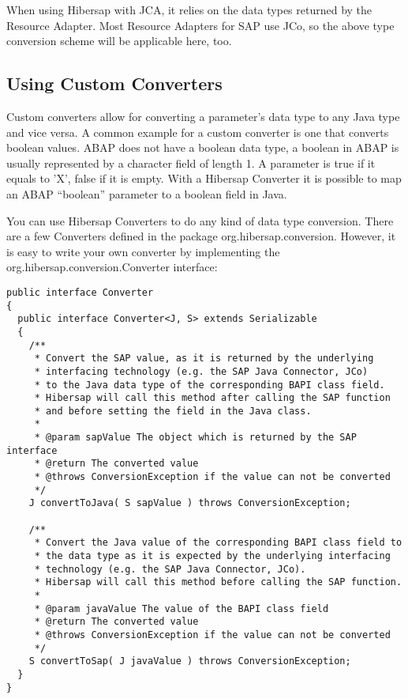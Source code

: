 When using Hibersap with JCA, it relies on the data types returned by the Resource Adapter. Most Resource Adapters for SAP use JCo, so the above type conversion scheme will be applicable here, too. 

\subsection{Using Custom Converters}

Custom converters allow for converting a parameter's data type to any Java type and vice versa. A common example for a custom converter is one that converts boolean values. ABAP does not have a boolean data type, a boolean in ABAP is usually represented by a character field of length 1. A parameter is true if it equals to 'X', false if it is empty. With a Hibersap Converter it is possible to map an ABAP ``boolean'' parameter to a boolean field in Java.

You can use Hibersap Converters to do any kind of data type conversion. There are a few Converters defined in the package org.hibersap.conversion. However, it is easy to write your own converter by implementing the org.hibersap.conversion.Converter interface:

\begin{lstlisting}[caption=The Converter interface]
public interface Converter
{
  public interface Converter<J, S> extends Serializable
  {
    /**
     * Convert the SAP value, as it is returned by the underlying 
     * interfacing technology (e.g. the SAP Java Connector, JCo) 
     * to the Java data type of the corresponding BAPI class field.
     * Hibersap will call this method after calling the SAP function 
     * and before setting the field in the Java class.
     *
     * @param sapValue The object which is returned by the SAP interface
     * @return The converted value
     * @throws ConversionException if the value can not be converted
     */
    J convertToJava( S sapValue ) throws ConversionException;

    /**
     * Convert the Java value of the corresponding BAPI class field to 
     * the data type as it is expected by the underlying interfacing 
     * technology (e.g. the SAP Java Connector, JCo).
     * Hibersap will call this method before calling the SAP function.
     *
     * @param javaValue The value of the BAPI class field
     * @return The converted value
     * @throws ConversionException if the value can not be converted
     */
    S convertToSap( J javaValue ) throws ConversionException;
  }
}
\end{lstlisting}

